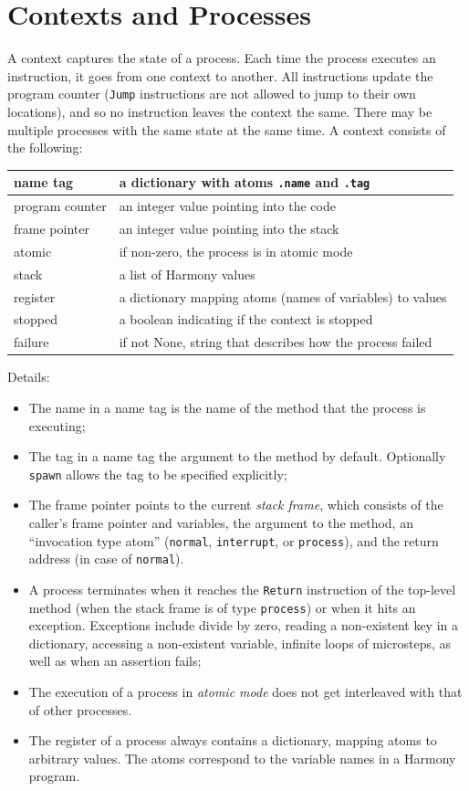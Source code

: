 \documentclass{report}
\begin{document}
\chapter{Contexts and Processes}
\label{app:context}

A context captures the state of a process.  Each time the process
executes an instruction, it goes from one context to another.
All instructions update the program counter (\texttt{Jump} instructions
are not allowed to jump to their own locations), and so no instruction
leaves the context the same.
There may be multiple processes
with the same state at the same time.
A context consists of the following:

\vspace{1em}
\begin{tabular}{|l|l|}
\hline
name tag & a dictionary with atoms \texttt{.name} and \texttt{.tag} \\
\hline
program counter & an integer value pointing into the code \\
\hline
frame pointer & an integer value pointing into the stack \\
\hline
atomic & if non-zero, the process is in atomic mode \\
\hline
stack & a list of Harmony values \\
\hline
register & a dictionary mapping atoms (names of variables) to values \\
\hline
stopped & a boolean indicating if the context is stopped \\
\hline
failure & if not None, string that describes how the process failed \\
\hline
\end{tabular}
\vspace{1em}

Details:
\begin{itemize}
\item The name in a name tag is the name of the method that the process
is executing;
\item The tag in a name tag the argument to the method by default.  Optionally
\texttt{spawn} allows the tag to be specified explicitly;
\item The frame pointer points to the current \emph{stack frame},
which consists of the caller's frame pointer and variables, the argument to
the method, an ``invocation type atom'' (\texttt{normal}, \texttt{interrupt}, or
\texttt{process}), and the return address (in case of \texttt{normal}).
\item A process terminates when it reaches the \texttt{Return} instruction
of the top-level method (when the stack frame is of type \texttt{process})
or when it hits an exception.  Exceptions include divide by zero,
reading a non-existent key in a dictionary, accessing a non-existent
variable, infinite loops of microsteps, as well as when an assertion fails;
\item The execution of a process in \emph{atomic mode} does not get interleaved
with that of other processes.
\item The register of a process always contains a dictionary, mapping
atoms to arbitrary values.  The atoms correspond to the variable names
in a Harmony program.
\end{itemize}
\end{document}
